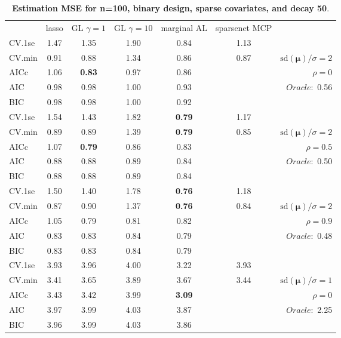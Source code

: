 \begin{table}\vspace{-.5cm}
\caption[l]{ { \bf Estimation MSE for n=100, binary design, 
sparse covariates, and  decay  50}.}
\vspace{-.5cm}
\footnotesize{}
\begin{center}
\begin{tabular}{l*{5}{c}|r}
& lasso & GL $\gamma=1$ & GL $\gamma=10$ & marginal AL & sparsenet MCP  & \\
 \cline{1-7}
CV.1se & 1.47 & 1.35 & 1.90 & 0.84 & 1.13 & \\
CV.min & 0.91 & 0.88 & 1.34 & 0.86 & 0.87 &  $\mathrm{sd}(\mathbf{\mu})/\sigma=2$ \\
AICc & 1.06 & {\bf 0.83} & 0.97 & 0.86 & & $\rho=0$ \\
AIC & 0.98 & 0.98 & 1.00 & 0.93 & &  \multirow{2}{*}{$Oracle: $ 0.56} \\
BIC & 0.98 & 0.98 & 1.00 & 0.92 & &  \\
 \hline 
CV.1se & 1.54 & 1.43 & 1.82 & {\bf 0.79} & 1.17 & \\
CV.min & 0.89 & 0.89 & 1.39 & {\bf 0.79} & 0.85 &  $\mathrm{sd}(\mathbf{\mu})/\sigma=2$ \\
AICc & 1.07 & {\bf 0.79} & 0.86 & 0.83 & & $\rho=0.5$ \\
AIC & 0.88 & 0.88 & 0.89 & 0.84 & &  \multirow{2}{*}{$Oracle: $ 0.50} \\
BIC & 0.88 & 0.88 & 0.89 & 0.84 & &  \\
 \hline 
CV.1se & 1.50 & 1.40 & 1.78 & {\bf 0.76} & 1.18 & \\
CV.min & 0.87 & 0.90 & 1.37 & {\bf 0.76} & 0.84 &  $\mathrm{sd}(\mathbf{\mu})/\sigma=2$ \\
AICc & 1.05 & 0.79 & 0.81 & 0.82 & & $\rho=0.9$ \\
AIC & 0.83 & 0.83 & 0.84 & 0.79 & &  \multirow{2}{*}{$Oracle: $ 0.48} \\
BIC & 0.83 & 0.83 & 0.84 & 0.79 & &  \\
 \hline 
CV.1se & 3.93 & 3.96 & 4.00 & 3.22 & 3.93 & \\
CV.min & 3.41 & 3.65 & 3.89 & 3.67 & 3.44 &  $\mathrm{sd}(\mathbf{\mu})/\sigma=1$ \\
AICc & 3.43 & 3.42 & 3.99 & {\bf 3.09} & & $\rho=0$ \\
AIC & 3.97 & 3.99 & 4.03 & 3.87 & &  \multirow{2}{*}{$Oracle: $ 2.25} \\
BIC & 3.96 & 3.99 & 4.03 & 3.86 & &  \\
 \hline 

\end{tabular}
\end{center}
\end{table}
